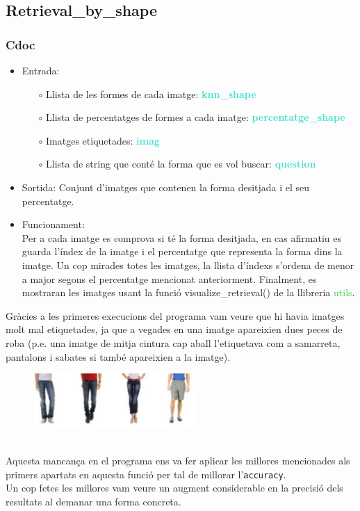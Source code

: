 \documentclass[a4paper, 11pt]{article}
\begin{document}
\newpage
\subsection{Retrieval\_by\_shape}\label{shape}
\subsubsection{Cdoc}
\begin{itemize}
    \item Entrada: 
    \begin{itemize}
        \item[$\circ$] Llista de les formes de cada imatge: \textbf{\textcolor{Turquoise}{knn\_shape}}
        \item[$\circ$] Llista de percentatges de formes a cada imatge: \textbf{\textcolor{Turquoise}{percentatge\_shape}}
        \item[$\circ$] Imatges etiquetades: \textbf{\textcolor{Turquoise}{imag}}
        \item[$\circ$] Llista de string que conté la forma que es vol buscar: \textbf{\textcolor{Turquoise}{question}}
    \end{itemize}
    \item Sortida: Conjunt d'imatges que contenen la forma desitjada i el seu percentatge.
    \item Funcionament: \\
    Per a cada imatge es comprova si té la forma desitjada, en cas afirmatiu es guarda l'índex de la imatge i el percentatge que representa la forma dins la imatge. Un cop mirades totes les imatges, la llista d'índexs s'ordena de menor a major segons el percentatge mencionat anteriorment. Finalment, es mostraran les imatges usant la funció \textcolor{funcblue}{visualize\_retrieval()} de la llibreria \textcolor{LimeGreen}{utils}.
\end{itemize}
Gràcies a les primeres execucions del programa vam veure que hi havia imatges molt mal etiquetades, ja que a vegades en una imatge apareixien dues peces de roba (p.e. una imatge de mitja cintura cap aball l'etiquetava com a samarreta, pantalons i sabates si també apareixien a la imatge).\\
\begin{figure}[h]
 \centering
    \includegraphics[width=0.55\textwidth]{shape_pocho.PNG}
\end{figure}\\
Aquesta mancança en el programa ens va fer aplicar les millores mencionades als primers apartats en aquesta funció per tal de millorar l'\texttt{accuracy}.\\
Un cop fetes les millores vam veure un augment considerable en la precisió dels resultats al demanar una forma concreta.
\end{document}
